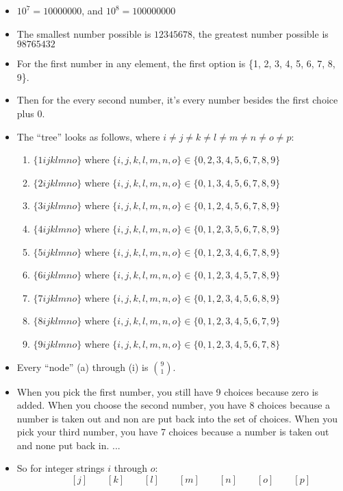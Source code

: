 \documentclass[11pt]{article}
\begin{document}
\begin{enumerate}
\begin{itemize}
\item $10^7 = 10000000$, and $10^8 = 100000000$
\item The smallest number possible is $12345678$, the greatest number possible is $98765432$
\item For the first number in any element, the first option is \{1, 2, 3, 4, 5, 6, 7, 8, 9\}.
\item Then for the every second number, it's every number besides the first choice plus 0.
\item The ``tree'' looks as follows, where $i\neq j\neq k\neq l\neq m\neq n\neq o\neq p$:
\begin{enumerate}
\item $\{1 i j k l m n o \}$ where $\{i,j,k,l,m,n,o\} \in \{0,2,3,4,5,6,7,8,9\}$
\item $\{2 i j k l m n o \}$ where $\{i,j,k,l,m,n,o\} \in \{0,1,3,4,5,6,7,8,9\}$
\item $\{3 i j k l m n o \}$ where $\{i,j,k,l,m,n,o\} \in \{0,1,2,4,5,6,7,8,9\}$
\item $\{4 i j k l m n o \}$ where $\{i,j,k,l,m,n,o\} \in \{0,1,2,3,5,6,7,8,9\}$
\item $\{5 i j k l m n o \}$ where $\{i,j,k,l,m,n,o\} \in \{0,1,2,3,4,6,7,8,9\}$
\item $\{6 i j k l m n o \}$ where $\{i,j,k,l,m,n,o\} \in \{0,1,2,3,4,5,7,8,9\}$
\item $\{7 i j k l m n o \}$ where $\{i,j,k,l,m,n,o\} \in \{0,1,2,3,4,5,6,8,9\}$
\item $\{8 i j k l m n o \}$ where $\{i,j,k,l,m,n,o\} \in \{0,1,2,3,4,5,6,7,9\}$
\item $\{9 i j k l m n o \}$ where $\{i,j,k,l,m,n,o\} \in \{0,1,2,3,4,5,6,7,8\}$
\end{enumerate} 
\item Every ``node'' (a) through (i) is $9 \choose 1$.
\item When you pick the first number, you still have 9 choices because zero is added. When you choose the second number, you have 8 choices because a number is taken out and non are put back into the set of choices. When you pick your third number, you have 7 choices because a number is taken out and none put back in. ...
\item So for integer strings $i$ through $o$:
\begin{equation*}
[i]\quad\quad[j]\quad\quad[k]\quad\quad[l]\quad\quad[m]\quad\quad[n]\quad\quad[o]\quad\quad[p]
\end{equation*}


\end{itemize}
\end{enumerate}
\end{document}

